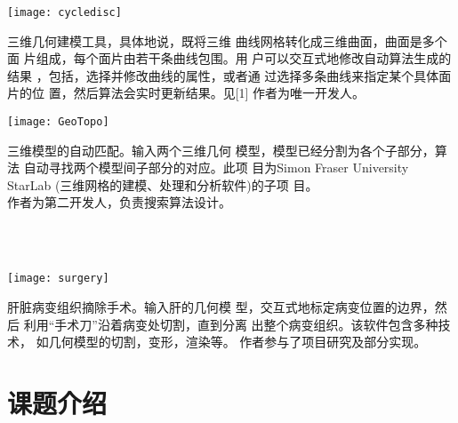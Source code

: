 \documentclass[20pt]{article} %
\begin{document}
\begin{minipage}{0.5\textwidth}
{
\center
  \texttt{[image: cycledisc]}
}
\end{minipage}
\begin{minipage}{0.5\textwidth}
三维几何建模工具，具体地说，既将三维
曲线网格转化成三维曲面，曲面是多个面
片组成，每个面片由若干条曲线包围。用
户可以交互式地修改自动算法生成的结果
，包括，选择并修改曲线的属性，或者通
过选择多条曲线来指定某个具体面片的位
置，然后算法会实时更新结果。见[1]
作者为唯一开发人。\\
\end{minipage}


\begin{minipage}{0.5\textwidth}
{
\center
  \texttt{[image: GeoTopo]}
}
\end{minipage}
\begin{minipage}{0.5\textwidth}
三维模型的自动匹配。输入两个三维几何
模型，模型已经分割为各个子部分，算法
自动寻找两个模型间子部分的对应。此项
目为{Simon Fraser University StarLab}
(三维网格的建模、处理和分析软件)的子项
目。\\
作者为第二开发人，负责搜索算法设计。
\end{minipage}
\\
\\


\begin{minipage}{0.5\textwidth}
{
\center
  \texttt{[image: surgery]}
}
\end{minipage}
\begin{minipage}{0.5\textwidth}
肝脏病变组织摘除手术。输入肝的几何模
型，交互式地标定病变位置的边界，然后
利用“手术刀”沿着病变处切割，直到分离
出整个病变组织。该软件包含多种技术，
如几何模型的切割，变形，渲染等。
作者参与了项目研究及部分实现。
\end{minipage}

\section{课题介绍}
\end{document}
